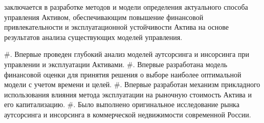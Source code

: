 заключается в разработке методов и модели определения актуального способа управления Активом, обеспечивающим повышение финансовой привлекательности и эксплуатационной устойчивости Актива на основе результатов анализа существующих моделей управления.

#. Впервые проведен глубокий анализ моделей аутсорсинга и инсорсинга при управлении и эксплуатации Активами.
#. Впервые разработана модель финансовой оценки для принятия решения о выборе наиболее оптимальной модели с учетом времени и целей.
#. Впервые разработан механизм прикладного использования влияния метода эксплуатации на рыночную стоимость Актива и его капитализацию.
#. Было выполнено оригинальное исследование рынка аутсорсинга и инсорсинга в коммерческой недвижимости современной России.
